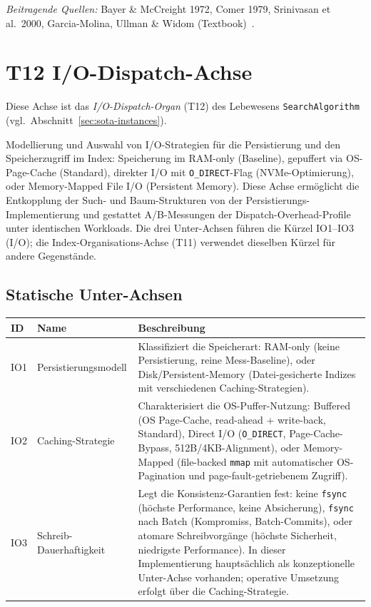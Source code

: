 \emph{Beitragende Quellen:} Bayer \& Mc\allowbreak{}Creight 1972, Comer 1979, Srinivasan et al.\ 2000, Garcia-Molina, Ullman \& Widom (Textbook)~\cite{bayer1972btree,comer1979btree,srinivasan2000oracle8iiot,garciamolina2009dbsystems}.


\section{T12 I/\allowbreak{}O-Dispatch-Achse}

Diese Achse ist das \emph{I/O-Dispatch-Organ} (T12) des Lebewesens \texttt{SearchAlgorithm} (vgl.\ Abschnitt~\ref{sec:sota-instances}).

Modellierung und Auswahl von I/\allowbreak{}O-Strategien für die Persistierung und den Speicherzugriff im Index: Speicherung im RAM-only (Baseline), gepuffert via OS-Page-Cache (Standard), direkter I/\allowbreak{}O mit \texttt{O\_\allowbreak{}DIRECT}-Flag (NVMe-Optimierung), oder Memory-Mapped File I/\allowbreak{}O (Persistent Memory). Diese Achse ermöglicht die Entkopplung der Such- und Baum-Strukturen von der Persistierungs-Implementierung und gestattet A/\allowbreak{}B-Messungen der Dispatch-Overhead-Profile unter identischen Workloads. Die drei Unter-Achsen führen die Kürzel IO1--IO3 (I/\allowbreak{}O); die Index-Organisations-Achse (T11) verwendet dieselben Kürzel für andere Gegenstände.

\subsection*{Statische Unter-Achsen}

\begin{scriptsize}
\begin{longtable}{@{}>{\raggedright\arraybackslash}p{1.8cm} >{\raggedright\arraybackslash}p{3.2cm} >{\raggedright\arraybackslash}p{8.5cm}@{}}
\toprule
ID & Name & Beschreibung \\
\midrule
\endhead%
IO1 & Persistierungsmodell & Klassifiziert die Speicherart: RAM-only (keine Persistierung, reine Mess-Baseline), oder Disk/\allowbreak{}Persistent-Memory (Datei-gesicherte Indizes mit verschiedenen Caching-Strategien). \\
IO2 & Caching-Strategie & Charakterisiert die OS-Puffer-Nutzung: Buffered (OS Page-Cache, read-ahead + write-back, Standard), Direct I/\allowbreak{}O (\texttt{O\_\allowbreak{}DIRECT}, Page-Cache-Bypass, 512\allowbreak{}B/\allowbreak{}4\allowbreak{}KB-Alignment), oder Memory-Mapped (file-backed \texttt{mmap} mit automatischer OS-Pagination und page-fault-getriebenem Zugriff). \\
IO3 & Schreib-Dauerhaftigkeit & Legt die Konsistenz-Garantien fest: keine \texttt{fsync} (höchste Performance, keine Absicherung), \texttt{fsync} nach Batch (Kompromiss, Batch-Commits), oder atomare Schreibvorgänge (höchste Sicherheit, niedrigste Performance). In dieser Implementierung hauptsächlich als konzeptionelle Unter-Achse vorhanden; operative Umsetzung erfolgt über die Caching-Strategie. \\
\bottomrule
\end{longtable}
\end{scriptsize}

